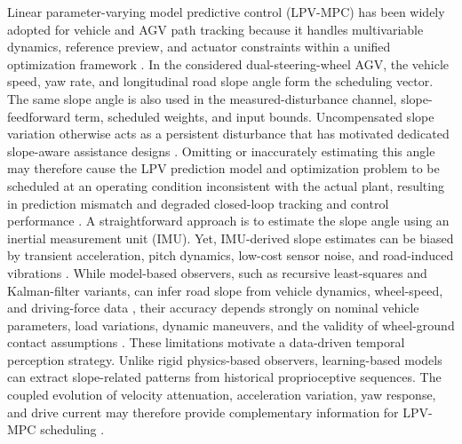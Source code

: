 \documentclass{ieeeaccess}
\newcommand{\citep}[1]{\cite{#1}}
\begin{document}
Linear parameter-varying model predictive control (LPV-MPC) has been widely adopted for vehicle and AGV path tracking because it handles multivariable dynamics, reference preview, and actuator constraints within a unified optimization framework \citep{Manikandan2022CurveAwareMPCAGV,Alcala2020AutonomousRacingLPVMPC,Kedir2024PSOLPVMPC,Domina2022LTVMPC}. In the considered dual-steering-wheel AGV, the vehicle speed, yaw rate, and longitudinal road slope angle form the scheduling vector. The same slope angle is also used in the measured-disturbance channel, slope-feedforward term, scheduled weights, and input bounds. Uncompensated slope variation otherwise acts as a persistent disturbance that has motivated dedicated slope-aware assistance designs \citep{Luo2015DownhillAssist}. Omitting or inaccurately estimating this angle may therefore cause the LPV prediction model and optimization problem to be scheduled at an operating condition inconsistent with the actual plant, resulting in prediction mismatch and degraded closed-loop tracking and control performance \citep{Sato2013InexactScheduling,Pan2022InexactSchedulingLPV,Metzler2021PredictionFidelity}. A straightforward approach is to estimate the slope angle using an inertial measurement unit (IMU). Yet, IMU-derived slope estimates can be biased by transient acceleration, pitch dynamics, low-cost sensor noise, and road-induced vibrations \citep{Jauch2018IMUGradeOrientation,Liu2023RoadSlopeAAIMM,Gao2024RoadSlopeHDV}. While model-based observers, such as recursive least-squares and Kalman-filter variants, can infer road slope from vehicle dynamics, wheel-speed, and driving-force data \citep{Jiang2019AdaptiveSlopeMass,Guo2022SageHusaAKF}, their accuracy depends strongly on nominal vehicle parameters, load variations, dynamic maneuvers, and the validity of wheel-ground contact assumptions \citep{Gao2024RoadSlopeHDV}. These limitations motivate a data-driven temporal perception strategy. Unlike rigid physics-based observers, learning-based models can extract slope-related patterns from historical proprioceptive sequences. The coupled evolution of velocity attenuation, acceleration variation, yaw response, and drive current may therefore provide complementary information for LPV-MPC scheduling \citep{Liang2022LSTMRoadID}.
\end{document}
